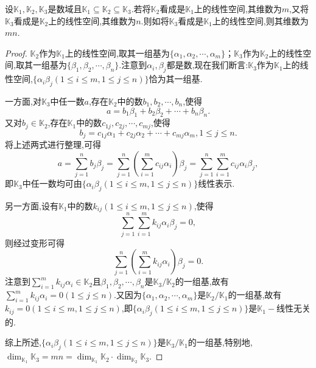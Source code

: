 \documentclass[../../main.tex]{subfiles}%
\begin{document}
\begin{proposition}\label{proposition:数域上的线性空间的维数的传递性}
设\(\mathbb{K}_1,\mathbb{K}_2,\mathbb{K}_3\)是数域且\(\mathbb{K}_1\subseteq\mathbb{K}_2\subseteq\mathbb{K}_3\).若将\(\mathbb{K}_2\)看成是\(\mathbb{K}_1\)上的线性空间,其维数为\(m\),又将\(\mathbb{K}_3\)看成是\(\mathbb{K}_2\)上的线性空间,其维数为\(n\).则如将\(\mathbb{K}_3\)看成是\(\mathbb{K}_1\)上的线性空间,则其维数为\(mn\).
\end{proposition}
\begin{proof}

\(\mathbb{K}_2\)作为\(\mathbb{K}_1\)上的线性空间,取其一组基为\(\{\alpha_1,\alpha_2,\cdots,\alpha_m\}\)；\(\mathbb{K}_3\)作为\(\mathbb{K}_2\)上的线性空间,取其一组基为\(\{\beta_1,\beta_2,\cdots,\beta_n\}\).注意到\(\alpha_i,\beta_j\)都是数,现在我们断言:\(\mathbb{K}_3\)作为\(\mathbb{K}_1\)上的线性空间,\(\{\alpha_i\beta_j(1\leqslant  i\leqslant  m,1\leqslant  j\leqslant  n)\}\)恰为其一组基.

一方面,对\(\mathbb{K}_3\)中任一数\(a\),存在\(\mathbb{K}_2\)中的数\(b_1,b_2,\cdots,b_n\),使得
\[
a = b_1\beta_1 + b_2\beta_2+\cdots + b_n\beta_n.
\]
又对\(b_j\in\mathbb{K}_2\),存在\(\mathbb{K}_1\)中的数\(c_{1j},c_{2j},\cdots,c_{mj}\),使得
\[
b_j = c_{1j}\alpha_1 + c_{2j}\alpha_2+\cdots + c_{mj}\alpha_m,1\leqslant  j\leqslant  n.
\]
将上述两式进行整理,可得
\[
a=\sum_{j = 1}^{n}b_j\beta_j=\sum_{j = 1}^{n}\left(\sum_{i = 1}^{m}c_{ij}\alpha_i\right)\beta_j=\sum_{j = 1}^{n}\sum_{i = 1}^{m}c_{ij}\alpha_i\beta_j,
\]
即\(\mathbb{K}_3\)中任一数均可由\(\{\alpha_i\beta_j(1\leqslant  i\leqslant  m,1\leqslant  j\leqslant  n)\}\)线性表示.

另一方面,设有\(\mathbb{K}_1\)中的数\(k_{ij}(1\leqslant  i\leqslant  m,1\leqslant  j\leqslant  n)\),使得
\[
\sum_{j = 1}^{n}\sum_{i = 1}^{m}k_{ij}\alpha_i\beta_j = 0,
\]
则经过变形可得
\[
\sum_{j = 1}^{n}\left(\sum_{i = 1}^{m}k_{ij}\alpha_i\right)\beta_j = 0.
\]
注意到\(\sum_{i = 1}^{m}k_{ij}\alpha_i\in\mathbb{K}_2\)且\(\beta_1,\beta_2,\cdots,\beta_n\)是\(\mathbb{K}_3/\mathbb{K}_2\)的一组基,故有\(\sum_{i = 1}^{m}k_{ij}\alpha_i = 0(1\leqslant  j\leqslant  n)\).又因为\(\{\alpha_1,\alpha_2,\cdots,\alpha_m\}\)是\(\mathbb{K}_2/\mathbb{K}_1\)的一组基,故有\(k_{ij}=0(1\leqslant  i\leqslant  m,1\leqslant  j\leqslant  n)\),即\(\{\alpha_i\beta_j(1\leqslant  i\leqslant  m,1\leqslant  j\leqslant  n)\}\)是\(\mathbb{K}_1-\)线性无关的.

综上所述,\(\{\alpha_i\beta_j(1\leqslant  i\leqslant  m,1\leqslant  j\leqslant  n)\}\)是\(\mathbb{K}_3/\mathbb{K}_1\)的一组基,特别地,\(\dim_{\mathbb{K}_1}\mathbb{K}_3=mn=\dim_{\mathbb{K}_1}\mathbb{K}_2\cdot\dim_{\mathbb{K}_2}\mathbb{K}_3\).

\end{proof}
\end{document}
